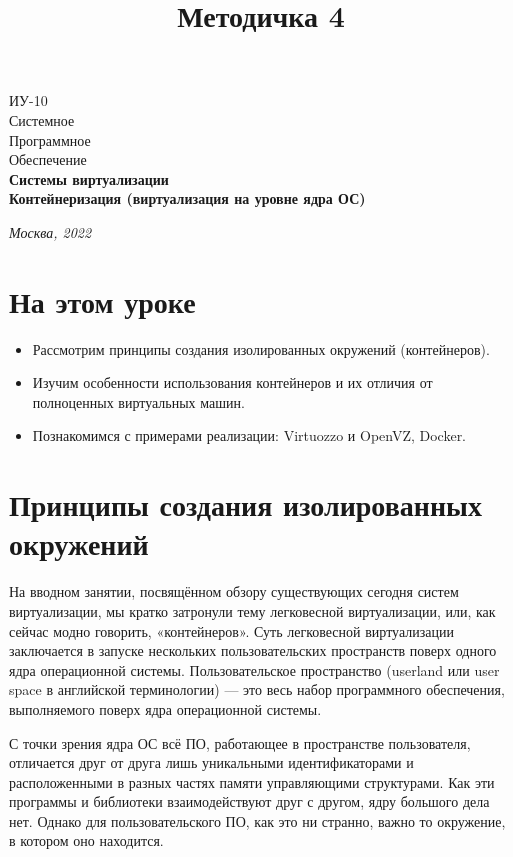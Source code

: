 \documentclass[14pt, a4paper]{article}
\title{Методичка 4}
\begin{document}
\begin{titlepage}
    \topmargin=216pt
    \newpage
    \hangindent=0.7cm
    \huge ИУ-10\\
    Системное\\
    Программное\\
    Обеспечение\\
    \textbf{Системы виртуализации\\ 
    Контейнеризация
(виртуализация
на уровне ядра ОС)}

    \vspace{10cm}

    \begin{center}
        \small\textit{Москва, 2022}
    \end{center}
\end{titlepage}
\section*{На этом уроке}
\begin{itemize}
    \item Рассмотрим принципы создания изолированных окружений (контейнеров).
    \item Изучим особенности использования контейнеров и их отличия от полноценных виртуальных
    машин.
    \item Познакомимся с примерами реализации: Virtuozzo и OpenVZ, Docker.
\end{itemize}
\tableofcontents
\newpage



\section*{Принципы создания изолированных окружений}

На вводном занятии, посвящённом обзору существующих сегодня систем виртуализации, мы кратко
затронули тему легковесной виртуализации, или, как сейчас модно говорить, «контейнеров». Суть
легковесной виртуализации заключается в запуске нескольких пользовательских пространств поверх
одного ядра операционной системы. Пользовательское пространство (userland или user space в
английской терминологии) — это весь набор программного обеспечения, выполняемого поверх ядра
операционной системы.

С точки зрения ядра ОС всё ПО, работающее в пространстве пользователя, отличается друг от друга
лишь уникальными идентификаторами и расположенными в разных частях памяти управляющими
структурами. Как эти программы и библиотеки взаимодействуют друг с другом, ядру большого дела
нет. Однако для пользовательского ПО, как это ни странно, важно то окружение, в котором оно
находится.
\end{document}
